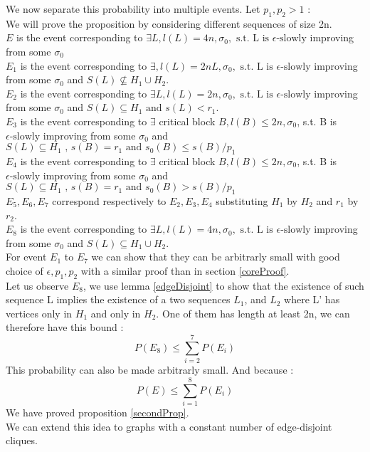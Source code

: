 \documentclass[12pt]{article}
\begin{document}
We now separate this probability into multiple events.
Let $p_1, p_2 > 1$ : \\
We will prove the proposition by considering different sequences of size 2n.\\
$E$ is the event corresponding to $\exists L, l(L) = 4n, \sigma_0, \text{ s.t. L is }\epsilon\text{-slowly}$ improving from some $\sigma_0 $\\
$E_1$ is the event corresponding to $\exists, l(L) = 2n L, \sigma_0, \text{ s.t. L is }\epsilon\text{-slowly} $ improving from  some $\sigma_0$  and $S(L) \not\subseteq H_1 \cup H_2$.\\
$E_2$ is the event corresponding to $\exists L, l(L) = 2n, \sigma_0,\text{ s.t. L is }\epsilon\text{-slowly} $ improving from some $\sigma_0$ and $S(L) \subseteq H_1\text{ and }s(L) < r_1$. \\
$E_3$   is the event corresponding to $\exists$ critical block  $B, l(B) \leq 2n, \sigma_0$, s.t. B is $\epsilon\text{-slowly} $ improving from some $\sigma_0$ and $S(L) \subseteq H_1 \text{ , } s(B) = r_1 \text{ and } s_0(B) \leq s(B) / p_1$ \\
$E_4$   is the event corresponding to $\exists$ critical block  $B, l(B) \leq 2n, \sigma_0$, s.t. B is $\epsilon\text{-slowly} $ improving from some $\sigma_0$ and $S(L) \subseteq H_1 \text{ , } s(B) = r_1 \text{ and } s_0(B) > s(B) / p_1$ \\
$E_5, E_6, E_7$ correspond respectively to $E_2, E_3, E_4$ substituting $H_1$ by $H_2$ and $r_1$ by $r_2$.\\
$E_8$  is the event corresponding to $\exists L, l(L) = 4n, \sigma_0,\text{ s.t. L is }\epsilon\text{-slowly} $ improving from some $\sigma_0$ and $S(L) \subseteq H_1\cup H_2.$ \\
For event $E_1$ to $E_7$ we can show that they can be arbitrarly small with good choice of $\epsilon, p_1, p_2$ with a similar proof than in section \ref{coreProof}.\\
Let us observe $E_8$, we use lemma \ref{edgeDisjoint} to show that the existence of such sequence L implies the existence of a two sequences $L_1$, and $L_2$ where L' has vertices only in $H_1$ and  only in $H_2$. One of them has length at least 2n, we can therefore have this bound :
\begin{equation*}
P(E_8) \leq \sum_{i = 2}^7 P(E_i)
\end{equation*} 
This probability can also be made arbitrarly small.  And because :
\begin{equation*}
P(E) \leq \sum_{i = 1}^8 P(E_i)
\end{equation*} 
We have proved proposition \ref{secondProp}. \\
We can extend this idea to graphs with a constant number of edge-disjoint cliques.
\end{document}
